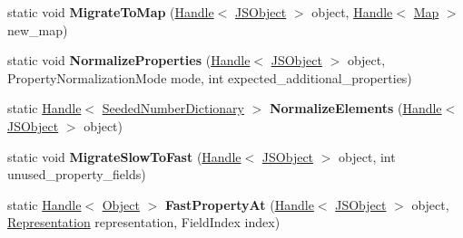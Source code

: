 \begin{DoxyCompactItemize}
\item 
\hypertarget{classv8_1_1internal_1_1_j_s_object_a73d14cd9893498c6ecd52fbe11baaaa4}{}static void {\bfseries Migrate\+To\+Map} (\hyperlink{classv8_1_1internal_1_1_handle}{Handle}$<$ \hyperlink{classv8_1_1internal_1_1_j_s_object}{J\+S\+Object} $>$ object, \hyperlink{classv8_1_1internal_1_1_handle}{Handle}$<$ \hyperlink{classv8_1_1internal_1_1_map}{Map} $>$ new\+\_\+map)\label{classv8_1_1internal_1_1_j_s_object_a73d14cd9893498c6ecd52fbe11baaaa4}

\item 
\hypertarget{classv8_1_1internal_1_1_j_s_object_a303c532c7d7f00d2fbebf5177ea4235e}{}static void {\bfseries Normalize\+Properties} (\hyperlink{classv8_1_1internal_1_1_handle}{Handle}$<$ \hyperlink{classv8_1_1internal_1_1_j_s_object}{J\+S\+Object} $>$ object, Property\+Normalization\+Mode mode, int expected\+\_\+additional\+\_\+properties)\label{classv8_1_1internal_1_1_j_s_object_a303c532c7d7f00d2fbebf5177ea4235e}

\item 
\hypertarget{classv8_1_1internal_1_1_j_s_object_ae2dffe7e7a583b86eaeb32c490c9cbbe}{}static \hyperlink{classv8_1_1internal_1_1_handle}{Handle}$<$ \hyperlink{classv8_1_1internal_1_1_seeded_number_dictionary}{Seeded\+Number\+Dictionary} $>$ {\bfseries Normalize\+Elements} (\hyperlink{classv8_1_1internal_1_1_handle}{Handle}$<$ \hyperlink{classv8_1_1internal_1_1_j_s_object}{J\+S\+Object} $>$ object)\label{classv8_1_1internal_1_1_j_s_object_ae2dffe7e7a583b86eaeb32c490c9cbbe}

\item 
\hypertarget{classv8_1_1internal_1_1_j_s_object_a212bd4e863228c1c37f607528ae613fb}{}static void {\bfseries Migrate\+Slow\+To\+Fast} (\hyperlink{classv8_1_1internal_1_1_handle}{Handle}$<$ \hyperlink{classv8_1_1internal_1_1_j_s_object}{J\+S\+Object} $>$ object, int unused\+\_\+property\+\_\+fields)\label{classv8_1_1internal_1_1_j_s_object_a212bd4e863228c1c37f607528ae613fb}

\item 
\hypertarget{classv8_1_1internal_1_1_j_s_object_a6eb754b8c258aa12505635627566fa22}{}static \hyperlink{classv8_1_1internal_1_1_handle}{Handle}$<$ \hyperlink{classv8_1_1internal_1_1_object}{Object} $>$ {\bfseries Fast\+Property\+At} (\hyperlink{classv8_1_1internal_1_1_handle}{Handle}$<$ \hyperlink{classv8_1_1internal_1_1_j_s_object}{J\+S\+Object} $>$ object, \hyperlink{classv8_1_1internal_1_1_representation}{Representation} representation, Field\+Index index)\label{classv8_1_1internal_1_1_j_s_object_a6eb754b8c258aa12505635627566fa22}


\end{DoxyCompactItemize}

